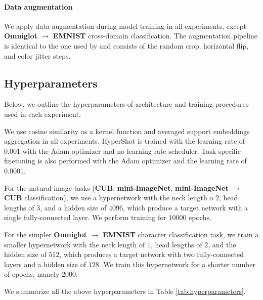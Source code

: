 \documentclass[nohyperref]{article}
\def\our{HyperShot}
\theoremstyle{plain}
\theoremstyle{definition}
\theoremstyle{remark}
\begin{document}
\paragraph{Data augmentation}
    We apply data augmentation during model training in all experiments, except \textbf{Omniglot} $\rightarrow$ \textbf{EMNIST} cross-domain classification. The augmentation pipeline is identical to the one used by \cite{patacchiola2020bayesian} and consists of the random crop, horizontal flip, and color jitter steps.

\subsection{Hyperparameters}

    Below, we outline the hyperparameters of architecture and training procedures used in each experiment.
    
    We use cosine similarity as a kernel function and averaged support embeddings aggregation in all experiments. \our{} is trained with the learning rate of $0.001$ with the Adam optimizer \cite{kingma2014adam} and no learning rate scheduler. Task-specific finetuning is also performed with the Adam optimizer and the learning rate of $0.0001$.
    
    For the natural image tasks (\textbf{CUB}, \textbf{mini-ImageNet}, \textbf{mini-ImageNet} $\rightarrow$ \textbf{CUB} classification), we use a hypernetwork with the neck length o $2$, head lengths of $3$, and a hidden size of $4096$, which produce a target network with a single fully-connected layer. We perform training for $10000$ epochs.
    
    For the simpler \textbf{Omniglot} $\rightarrow$ \textbf{EMNIST} character classification task, we train a smaller hypernetwork with the neck length of $1$, head lengths of $2$, and the hidden size of $512$, which produces a target network with two fully-connected layers and a hidden size of $128$. We train this hypernetwork for a shorter number of epochs, namely $2000$.
    
    We summarize all the above hyperparameters in Table \ref{tab:hyperparameters}.
    
    
\end{document}
